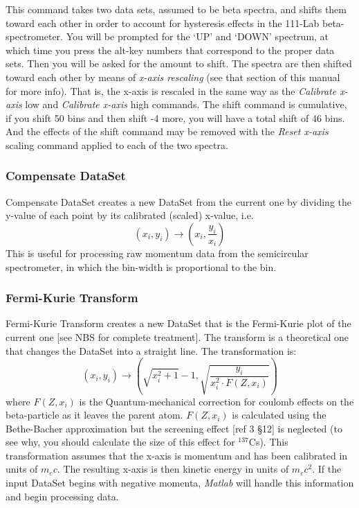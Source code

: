 \documentclass{../lab}
\begin{document}
This command takes two data sets, assumed to be beta spectra, and shifts them toward each other in order to account for hysteresis effects in the 111-Lab beta-spectrometer. You will be prompted for the `UP' and `DOWN' spectrum, at which time you press the alt-key numbers that correspond to the proper data sets. Then you will be asked for the amount to shift. The spectra are then shifted toward each other by means of \emph{x-axis rescaling} (see that section of this manual for more info). That is, the x-axis is rescaled in the same way as the \emph{Calibrate x-axis} low and \emph{Calibrate x-axis} high commands. The shift command is cumulative, if you shift 50 bins and then shift -4 more, you will have a total shift of 46 bins. And the effects of the shift command may be removed with the \emph{Reset x-axis} scaling command applied to each of the two spectra.

\subsubsection{Compensate DataSet}

Compensate DataSet creates a new DataSet from the current one by dividing the y-value of each point by its calibrated (scaled) x-value, i.e.
\[
    \left( x_i, y_i \right) \rightarrow \left( x_i, \frac {y_i}{x_i} \right)
\]
This is useful for processing raw momentum data from the semicircular spectrometer, in which the bin-width is proportional to the bin.

\subsubsection{Fermi-Kurie Transform}

Fermi-Kurie Transform creates a new DataSet that is the Fermi-Kurie plot of the current one [see NBS for complete treatment]. The transform is a theoretical one that changes the DataSet into a straight line. The transformation is:
\[
\left(x_{i},y_{i}\right) \rightarrow \left(\sqrt{x_{i}^{2}+1}-1, \sqrt{\frac{y_{i}}{x_{i}^{2} \cdot F\left(Z,x_{i}\right)}}\right)
\]
where $F(Z, x_{i})$ is the Quantum-mechanical correction for coulomb effects on the beta-particle as it leaves the parent atom. $F(Z, x_{i})$ is calculated using the Bethe-Bacher approximation but the screening effect [ref 3 \S12] is neglected (to see why, you should calculate the size of this effect for $^{137}$Cs). This transformation assumes that the x-axis is momentum and has been calibrated in units of $m_e c$. The resulting x-axis is then kinetic energy in units of $m_e c^{2}$. If the input DataSet begins with negative momenta, \emph{Matlab} will handle this information and begin processing data.
\end{document}
